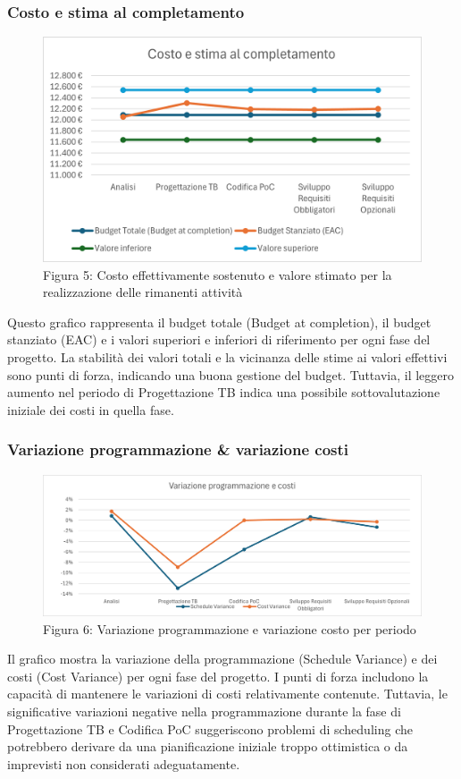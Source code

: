 \documentclass{article}
\begin{document}
\subsubsection{Costo e stima al completamento}
    
    \begin{figure}[H]
    \centering
    \includegraphics{documenti/grafici/CostoEStimaAlCompletamentoPB.png}
    \caption{Figura 5: Costo effettivamente sostenuto e valore stimato per la realizzazione delle rimanenti attività}
\end{figure}
Questo grafico rappresenta il budget totale (Budget at completion), il budget stanziato (EAC) e i valori superiori e inferiori di riferimento per ogni fase del progetto. La stabilità dei valori totali e la vicinanza delle stime ai valori effettivi sono punti di forza, indicando una buona gestione del budget. Tuttavia, il leggero aumento nel periodo di Progettazione TB indica una possibile sottovalutazione iniziale dei costi in quella fase.

\subsubsection{Variazione programmazione \& variazione costi}
\begin{figure}[H]
    \centering
    \includegraphics{documenti/grafici/VariazioneProgrammazioneECostiPB.png}
    \caption{Figura 6: Variazione programmazione e variazione costo per periodo}
    \end{figure}
    Il grafico mostra la variazione della programmazione (Schedule Variance) e dei costi (Cost Variance) per ogni fase del progetto. I punti di forza includono la capacità di mantenere le variazioni di costi relativamente contenute. Tuttavia, le significative variazioni negative nella programmazione durante la fase di Progettazione TB e Codifica PoC suggeriscono problemi di scheduling che potrebbero derivare da una pianificazione iniziale troppo ottimistica o da imprevisti non considerati adeguatamente.
\end{document}
